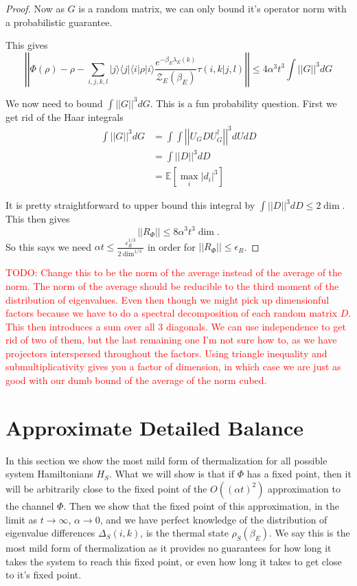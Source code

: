 \documentclass{article}
\newcommand{\ket}[1]{|#1\rangle}
\newcommand{\bra}[1]{\langle #1|}
\newcommand{\ketbra}[2]{| #1\rangle\! \langle #2|}
\newcommand{\brackets}[1]{\left[ #1 \right]}
\newcommand{\norm}[1]{\left| \left| #1 \right| \right|}
\newcommand{\expect}[1]{\mathbb{E}\brackets{#1}}
\newcommand{\bigo}[1]{O\left( #1 \right)}
\newcommand{\partfun}{\mathcal{Z}}
\begin{document}
\begin{proof}
Now as $G$ is a random matrix, we can only bound it's operator norm with a probabilistic guarantee. 

This gives
\begin{equation}
    \norm{\Phi(\rho) - \rho - \sum_{i,j,k,l} \ketbra{j}{j} \bra{i} \rho \ket{i} \frac{e^{-\beta_E \lambda_E(k)}}{\partfun_E(\beta_E)} \tau(i,k | j, l) } \leq 4 \alpha^3 t^3 \int \norm{G}^3 dG
\end{equation}

We now need to bound $\int \norm{G}^3 dG$. This is a fun probability question. First we get rid of the Haar integrals
\begin{align}
    \int \norm{G}^3 dG &= \int \int \norm{U_G D U_G^\dagger}^3  dU dD \\
    &= \int \norm{D}^3 dD \\
    &= \expect{\max_i |d_i|^3}
\end{align}

It is pretty straightforward to upper bound this integral by $\int \norm{D}^3 dD \leq 2 \dim$. This then gives
\begin{equation}
    \norm{R_{\Phi}} \leq 8 \alpha^3 t^3 \dim.
\end{equation}
So this says we need $\alpha t \leq \frac{\epsilon_{R}^{1/3}}{2 \dim^{1/3}}$ in order for $\norm{R_{\Phi}} \leq \epsilon_R$.
\end{proof}

\textcolor{red}{TODO: Change this to be the norm of the average instead of the average of the norm. The norm of the average should be reducible to the third moment of the distribution of eigenvalues. Even then though we might pick up dimensionful factors because we have to do a spectral decomposition of each random matrix $D$. This then introduces a sum over all 3 diagonals. We can use independence to get rid of two of them, but the last remaining one I'm not sure how to, as we have projectors interspersed throughout the factors. Using triangle inequality and submultiplicativity gives you a factor of dimension, in which case we are just as good with our dumb bound of the average of the norm cubed.}

\section{Approximate Detailed Balance}
In this section we show the most mild form of thermalization for all possible system Hamiltonians $H_S$. What we will show is that if $\Phi$ has a fixed point, then it will be arbitrarily close to the fixed point of the $\bigo{(\alpha t)^2}$ approximation to the channel $\Phi$. Then we show that the fixed point of this approximation, in the limit as $t \to \infty$, $\alpha \to 0$, and we have perfect knowledge of the distribution of eigenvalue differences $\Delta_S(i,k)$, is the thermal state $\rho_S(\beta_E)$. We say this is the most mild form of thermalization as it provides no guarantees for how long it takes the system to reach this fixed point, or even how long it takes to get close to it's fixed point. 
\end{document}
